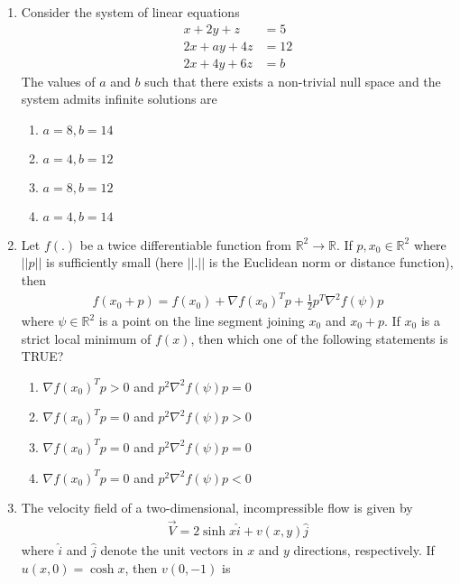 \documentclass[journal,11pt,onecolumn]{IEEEtran}
\begin{document}
\begin{enumerate}[resume]
    \item Consider the system of linear equations
          \begin{align}
              x + 2y + z   & = 5  \\
              2x + ay + 4z & = 12 \\
              2x + 4y + 6z & = b
          \end{align}
          The values of $a$ and $b$ such that there exists a non-trivial null space and the system admits infinite solutions are

          \begin{enumerate}
              \item $a = 8, b = 14$
              \item $a = 4, b = 12$
              \item $a = 8, b = 12$
              \item $a = 4, b = 14$
          \end{enumerate}

    \item Let $f(.)$ be a twice differentiable function from $\mathbb{R}^2 \to \mathbb{R}$. If $p, x_0 \in \mathbb{R}^2$ where $||p||$ is sufficiently small (here $||.||$ is the Euclidean norm or distance function), then
          \begin{align}
              f(x_0 + p) = f(x_0) + \nabla f(x_0)^T p + \frac{1}{2} p^T \nabla^2 f(\psi) p
          \end{align}
          where $\psi \in \mathbb{R}^2$ is a point on the line segment joining $x_0$ and $x_0 + p$. If $x_0$ is a strict local minimum of $f(x)$, then which one of the following statements is TRUE?

          \begin{enumerate}
              \item $\nabla f(x_0)^T p > 0$ and $p^2\nabla^2 f(\psi)p = 0$
              \item $\nabla f(x_0)^T p = 0$ and $p^2\nabla^2 f(\psi)p > 0$
              \item $\nabla f(x_0)^T p = 0$ and $p^2\nabla^2 f(\psi)p = 0$
              \item $\nabla f(x_0)^T p = 0$ and $p^2\nabla^2 f(\psi)p < 0$
          \end{enumerate}

    \item The velocity field of a two-dimensional, incompressible flow is given by
          \begin{align}
              \vec{V} = 2\sinh x \hat{i} + v(x,y) \hat{j}
          \end{align}
          where $\hat{i}$ and $\hat{j}$ denote the unit vectors in $x$ and $y$ directions, respectively. If $u(x,0) = \cosh x$, then $v(0,-1)$ is


\end{enumerate}
\end{document}
